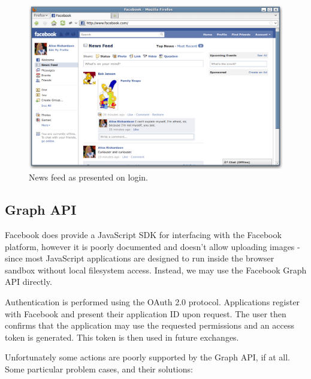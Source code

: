     \begin{figure}[tb]
        \begin{center}
                \includegraphics[width=12cm]{screens/facebook.png}
            \caption{News feed as presented on login.}
            \label{scn:fbook}
        \end{center}
    \end{figure}

\FloatBarrier
\subsection{Graph API}

Facebook does provide a JavaScript SDK for interfacing with the Facebook platform, however it is poorly documented and doesn't allow uploading images - since most JavaScript applications are designed to run inside the browser sandbox without local filesystem access. Instead, we may use the Facebook Graph API directly.

Authentication is performed using the OAuth 2.0 protocol. Applications register with Facebook and present their application ID upon request. The user then confirms that the application may use the requested permissions and an access token is generated. This token is then used in future exchanges.

Unfortunately some actions are poorly supported by the Graph API, if at all. Some particular problem cases, and their solutions:

